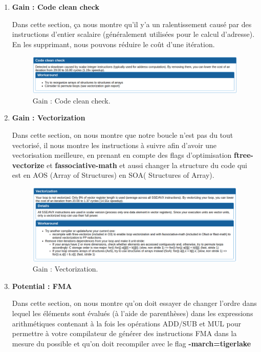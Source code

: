 \documentclass[a4paper, 12pt, twoside]{article}
\begin{document}
\begin{enumerate}
    \item[\textbullet]\textbf{Gain : Code clean check}
    
    Dans cette section, ça nous montre qu'il y'a un ralentissement causé par des instructions d'entier scalaire (généralement utilisées pour le calcul d'adresse). En les supprimant, nous pouvons réduire le coût d'une itération.
       \begin{figure}[h]
    \centering
    \includegraphics[width=\textwidth]{Figures/cap5.png}
    \caption{Gain : Code clean check.}
    
    \end{figure}
    
    \newpage
    \item[\textbullet]\textbf{Gain : Vectorization}
    
    Dans cette section, on nous montre que notre boucle n'est pas du tout vectorisé, il nous montre les instructions à suivre afin d'avoir une vectorisation meilleure, en prenant en compte des flags d'optimisation \textbf{ftree-vectorize} et \textbf{fassociative-math} et aussi changer la structure du code qui est en AOS (Array of Structures) en SOA( Structures of Array).
    
        \begin{figure}[h]
    \centering
    \includegraphics[width=\textwidth]{Figures/cap6.png}
    \caption{Gain : Vectorization.}
    
    \end{figure}
    \item[\textbullet]\textbf{Potential : FMA}
    
    Dans cette section, on nous montre qu'on doit essayer de changer l'ordre dans lequel les éléments sont évalués (à l'aide de parenthèses) dans les expressions arithmétiques contenant à la fois les opérations ADD/SUB et MUL pour permettre à votre compilateur de générer des instructions FMA dans la mesure du possible et qu'on doit recompiler avec le flag \textbf{-march=tigerlake}
    

\end{enumerate}
\end{document}
